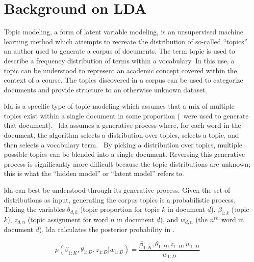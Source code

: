 \section{Background on LDA}
\label{sec:background}


Topic modeling, a form of latent variable modeling, is an unsupervised machine learning method which attempts to recreate the distribution of so-called ``topics'' an author used to generate a corpus of documents.
The term topic is used to describe a frequency distribution of terms within a vocabulary.
In this use, a topic can be understood to represent an academic concept covered within the context of a course.
The topics discovered in a corpus can be used to categorize documents and provide structure to an otherwise unknown dataset.


\acf{lda} is a specific type of topic modeling which assumes that a mix of multiple topics exist within a single document in some proportion (\ie\ were used to generate that document).~\cite{Blei2003}
\ac{lda} assumes a generative process where, for each word in the document, the algorithm selects a distribution over topics, selects a topic, and then selects a vocabulary term.~\cite{Blei2003}
By picking a distribution over topics, multiple possible topics can be blended into a single document.
Reversing this generative process is significantly more difficult because the topic distributions are unknown; this is what the ``hidden model'' or ``latent model'' refers to.


\ac{lda} can best be understood through its generative process.
Given the set of distributions as input, generating the corpus topics is a probabilistic process.
Taking the variables $\theta_{d,k}$ (topic proportion for topic $k$ in document $d$), $\beta_{1:k}$ (topic $k$), $z_{d,n}$ (topic assignment for word $n$ in document $d$), and $w_{d,n}$ (the $n^{th}$ word in document $d$), \ac{lda} calculates the posterior probability in .~\cite{Blei2012}


\begin{equation}
p(\beta_{1:K}, \theta_{1:D},z_{1:D} | w_{1:D}) = \frac{\beta_{1:K},
\theta_{1:D},z_{1:D}, w_{1:D}}{w_{1:D}}
\label{eq:posterior}
\end{equation}


